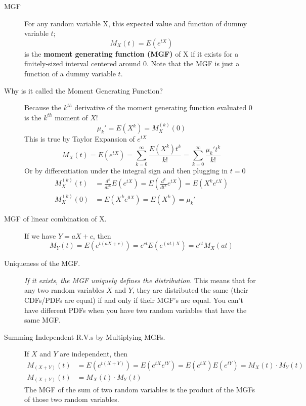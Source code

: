 \documentclass[11pt]{article}
\begin{document}
\begin{description}
  \item[MGF] For any random variable X, this expected value and function of dummy variable $t$;
    \[ M_X(t) = E(e^{tX}) \]
    is the \textbf{moment generating function (MGF)} of X if it exists for a finitely-sized interval centered around 0. Note that the MGF is just a function of a dummy variable $t$.
  \item[Why is it called the Moment Generating Function?] Because the $k^{th}$ derivative of the moment generating function evaluated 0 is the $k^{th}$ moment of $X$!
  \[\mu_k' = E(X^k) = M_X^{(k)}(0)\]
  This is true by Taylor Expansion of $e^{tX}$
  \[M_X(t) = E(e^{tX}) = \sum_{k=0}^\infty \frac{E(X^k)t^k}{k!} = \sum_{k=0}^\infty \frac{\mu_k't^k}{k!} \]
  Or by differentiation under the integral sign and then plugging in $t=0$
  \begin{align*}
    M_X^{(k)}(t) &= \frac{d^k}{dt^k}E(e^{tX}) = E(\frac{d^k}{dt^k}e^{tX}) = E(X^ke^{tX}) \\
    M_X^{(k)}(0) &= E(X^ke^{0X}) = E(X^k) = \mu_k'
  \end{align*}

  \item[MGF of linear combination of X.] If we have $Y = aX + c$, then
    \[M_Y(t) = E(e^{t(aX + c)}) =  e^{ct}E(e^{(at)X}) = e^{ct}M_X(at)\]


\item[Uniqueness of the MGF.] \emph{If it exists, the MGF uniquely defines the distribution}. This means that for any two random variables $X$ and $Y$, they are distributed the same (their CDFs/PDFs are equal) if and only if their MGF's are equal. You can't have different PDFs when you have two random variables that have the same MGF.
  \item[Summing Independent R.V.s by Multiplying MGFs.] If $X$ and $Y$ are independent, then
  \begin{align*}
    M_{(X+Y)}(t) &= E(e^{t(X + Y)}) = E(e^{tX}e^{tY}) = E(e^{tX})E(e^{tY}) = M_X(t) \cdot M_Y(t) \\
    M_{(X+Y)}(t) &= M_X(t) \cdot M_Y(t)
  \end{align*}
  The MGF of the sum of two random variables is the product of the MGFs of those two random variables.
\end{description}
\end{document}
